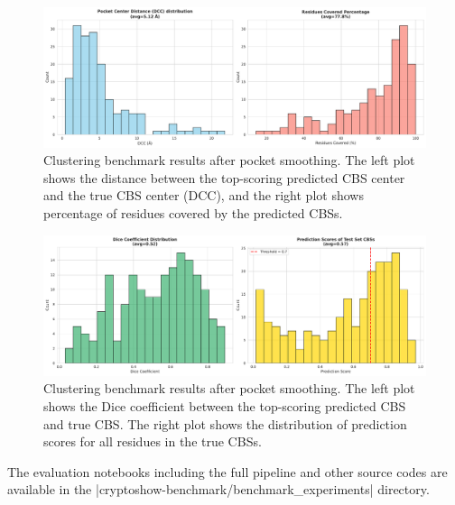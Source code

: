 \begin{figure}[htbp]
    \centering
    \includegraphics[width=\textwidth]{img/smoothened-1.pdf}
    \caption{Clustering benchmark results after pocket smoothing. The left plot shows the distance between the top-scoring predicted CBS center and the true CBS center (DCC), and the right plot shows percentage of residues covered by the predicted CBSs.}
    \label{fig:clustering-benchmark-smoothened}
\end{figure}

\begin{figure}[htbp]
    \centering
    \includegraphics[width=\textwidth]{img/smoothened-2.pdf}
    \caption{Clustering benchmark results after pocket smoothing. The left plot shows the Dice coefficient between the top-scoring predicted CBS and true CBS. The right plot shows the distribution of prediction scores for all residues in the true CBSs.}
    \label{fig:clustering-benchmark-smoothened-dice}
\end{figure}

The evaluation notebooks including the full pipeline and other source codes are available in the \inline|cryptoshow-benchmark/benchmark_experiments| directory.
